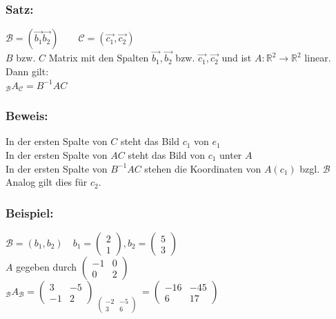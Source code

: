 \subsubsection{Satz:}
$\mathcal{B} = (\vec{b_{1}} \vec{b_{2}}) \qquad \mathcal{C} = (\vec{c_{1}}, \vec{c_{2}})$\\
$B$ bzw. $C$ Matrix mit den Spalten $\vec{b_{1}}, \vec{b_{2}}$ bzw. $\vec{c_{1}}, \vec{c_{2}}$ und ist $A: \mathbb{R}^{2} \rightarrow \mathbb{R}^{2}$ linear. Dann gilt:\\
$_{\mathcal{B}}A_{\mathcal{C}}=B^{-1}AC$\\
%
%
%
\subsubsection{Beweis:}
In der ersten Spalte von $C$ steht das Bild $c_{1}$ von $e_{1}$\\
In der ersten Spalte von $AC$ steht das Bild von $c_{1}$ unter $A$\\
In der ersten Spalte von $B^{-1}AC$ stehen die Koordinaten von $A(c_{1})$ bzgl. $\mathcal{B}$ Analog gilt dies für $c_{2}$.
%
%
%
\subsubsection{Beispiel:}
$\mathcal{B}=(b_{1},b_{2}) \quad b_{1}=\begin{pmatrix} 2 \\ 1 \end{pmatrix}, b_{2}=\begin{pmatrix}5 \\ 3\end{pmatrix}$\\
$A$ gegeben durch $\begin{pmatrix} -1 & 0 \\ 0 & 2 \end{pmatrix}$\\
$_{\mathcal{B}}A_{\mathcal{B}}=\begin{pmatrix} 3 & -5 \\ -1 & 2 \end{pmatrix} \mathop{\underbrace{\begin{pmatrix} -1 & 0 \\ 0 & 2\end{pmatrix} \begin{pmatrix}2 & 5 \\ 1 & 3 \end{pmatrix}}}\limits_{\begin{pmatrix}-2 & -5 \\ 3 & 6 \end{pmatrix}}= \begin{pmatrix} -16 & -45 \\ 6 & 17\end{pmatrix}$
%
%
%

